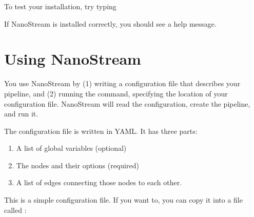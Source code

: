 \documentclass[letterpaper,10pt,english]{sphinxmanual}
\begin{document}
%
\begin{sphinxVerbatim}[commandchars=\\\{\}]
  
\end{sphinxVerbatim}

To test your installation, try typing

%
\begin{sphinxVerbatim}[commandchars=\\\{\}]
 
\end{sphinxVerbatim}

If NanoStream is installed correctly, you should see a help message.


\section{Using NanoStream}
\label{\detokenize{overview:using-nanostream}}
You use NanoStream by (1) writing a configuration file that describes your pipeline, and (2) running the  command, specifying the location of your
configuration file. NanoStream will read the configuration, create the pipeline,
and run it.

The configuration file is written in YAML. It has three parts:
\begin{enumerate}
\def\theenumi{\arabic{enumi}}
\def\labelenumi{\theenumi .}
\makeatletter\def\p@enumii{\p@enumi \theenumi .}\makeatother
\item {} 
A list of global variables (optional)

\item {} 
The nodes and their options (required)

\item {} 
A list of edges connecting those nodes to each other.

\end{enumerate}

This is a simple configuration file. If you want to, you can copy it into a
file called :
\end{document}
